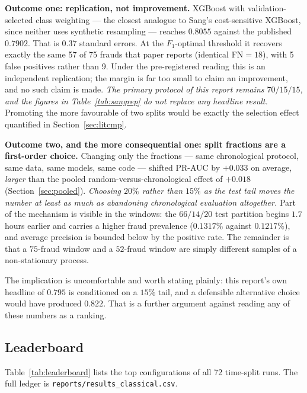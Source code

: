 \documentclass[11pt,a4paper]{article}
\newcommand{\code}[1]{\texttt{\small #1}}
\begin{document}
\textbf{Outcome one: replication, not improvement.} XGBoost with validation-selected class
weighting --- the closest analogue to Sang's cost-sensitive XGBoost, since neither uses
synthetic resampling --- reaches $0.8055$ against the published $0.7902$. That is $0.37$
standard errors. At the $F_1$-optimal threshold it recovers exactly the same 57 of 75 frauds
that paper reports (identical FN${}=18$), with 5 false positives rather than 9. Under the
pre-registered reading this is an independent replication; the margin is far too small to claim
an improvement, and no such claim is made. \emph{The primary protocol of this report remains
$70/15/15$, and the figures in Table~\ref{tab:sangrep} do not replace any headline result.}
Promoting the more favourable of two splits would be exactly the selection effect quantified in
Section~\ref{sec:litcmp}.

\textbf{Outcome two, and the more consequential one: split fractions are a first-order
choice.} Changing only the fractions --- same chronological protocol, same data, same models,
same code --- shifted PR-AUC by $+0.033$ on average, \emph{larger} than the pooled
random-versus-chronological effect of $+0.018$ (Section~\ref{sec:pooled}). \emph{Choosing $20\%$
rather than $15\%$ as the test tail moves the number at least as much as abandoning
chronological evaluation altogether.} Part of the mechanism is visible in the windows: the $66/14/20$ test partition
begins $1.7$ hours earlier and carries a higher fraud prevalence ($0.1317\%$ against
$0.1217\%$), and average precision is bounded below by the positive rate. The remainder is that
a $75$-fraud window and a $52$-fraud window are simply different samples of a non-stationary
process.

The implication is uncomfortable and worth stating plainly: this report's own headline of
$0.795$ is conditioned on a $15\%$ tail, and a defensible alternative choice would have
produced $0.822$. That is a further argument against reading any of these numbers as a ranking.

\subsection{Leaderboard}
Table~\ref{tab:leaderboard} lists the top configurations of all 72 time-split runs.
The full ledger is \code{reports/results\_classical.csv}.
\end{document}
